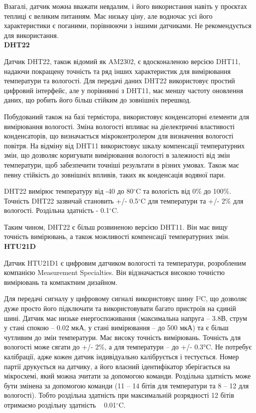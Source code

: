 Взагалі, датчик можна вважати невдалим, і його використання навіть у проєктах теплиці є великим питанням. Має низьку ціну, але водночас усі його характеристики є поганими, порівнюючи з іншими датчиками. Не рекомендується для використання.\\

\textbf{DHT22}\bigskip

Датчик DHT22, також відомий як AM2302, є вдосконаленою версією DHT11, надаючи покращену точність та ряд інших характеристик для вимірювання температури та вологості. Для передачі даних DHT22 використовує простий цифровий інтерфейс, але у порівнянні з DHT11, має меншу частоту оновлення даних, що робить його більш стійким до зовнішніх перешкод.

Побудований також на базі термістора, використовує конденсаторні елементи для вимірювання вологості. Зміна вологості впливає на діелектричні властивості конденсаторів, що визначається мікроконтролером для визначення вологості повітря. На відміну від DHT11 використовує шкалу компенсації температурних змін, що дозволяє коригувати вимірювання вологості в залежності від змін температури, щоб забезпечити точніші результати в різних умовах. Також має певну стійкість до зовнішніх впливів, таких як конденсація водяної пари.

DHT22 вимірює температуру від -40 до 80$^\circ$C та вологість від 0\% до 100\%. Точність DHT22 зазвичай становить +/- 0.5$^\circ$C для температури та +/- 2\% для вологості. Роздільна здатність - 0.1$^\circ$C.

Таким чином, DHT22 є більш розвиненою версією DHT11. Він має вищу точність вимірювань, а також можливості компенсації температурних змін.\\

\textbf{HTU21D}\bigskip

Датчик HTU21D1 є цифровим датчиком вологості та температури, розробленим компанією Measurement Specialties. Він відзначається високою точністю вимірювань та компактним дизайном.

Для передачі сигналу у цифровому сигналі використовує шину I²C, що дозволяє дуже просто його підключати та використовувати багато пристроїв на єдиній шині. Датчик має низьке енергоспоживання (максимальна напруга -- 3.8В, струм у стані спокою -- 0.02 мкА, у стані вимірювання -- до 500 мкА) та є більш чутливим до змін температури. Має високу точність вимірювань. Точність для вологості може сягати до +/- 2\%, а для температури -- до +/- 0.3°C. Не потребує калібрації, адже кожен датчик індивідуально калібрується і тестується. Номер партії друкується на датчику, а його власний ідентифікатор зберігається на мікросхемі, який можна зчитати за допомогою команди. Роздільна здатність може бути змінена за допомогою команди (11 -- 14 бітів для температури та 8 -- 12 для вологості). Тобто роздільна здатність при максимальній розрядності 12 бітів отримаємо роздільну здатність ~ 0.01$^\circ$C.

